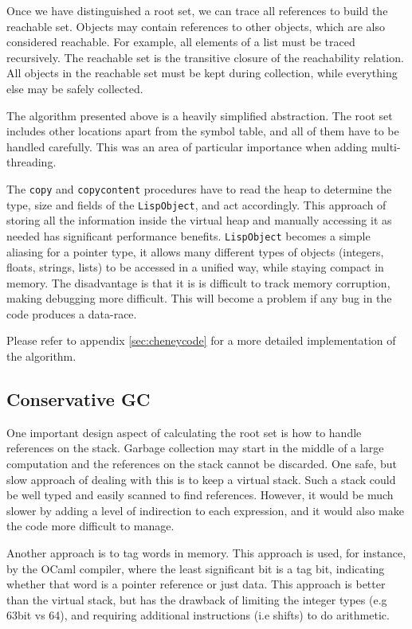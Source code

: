 Once we have distinguished a root set, we can trace all references to build the reachable set. Objects may contain references
to other objects, which are also considered reachable. For example, all elements of a list must be traced recursively.
The reachable set is the transitive closure of the reachability relation. All objects in the reachable set must be kept
during collection, while everything else may be safely collected.

The algorithm presented above is a heavily simplified abstraction. The root set includes other
locations apart from the symbol table, and all of them have to be handled carefully. This was an area
of particular importance when adding multi-threading.

The \texttt{copy} and \texttt{copycontent} procedures have to read the heap to determine the type, size and fields of
the \texttt{LispObject}, and act accordingly. This approach of storing all the information inside the virtual heap
and manually accessing it as needed has significant performance benefits. \texttt{LispObject} becomes a simple aliasing
for a pointer type, it allows many different types of objects (integers, floats, strings, lists) to be accessed
in a unified way, while staying compact in memory. The disadvantage is that it is is difficult to track memory
corruption, making debugging more difficult. This will become a problem if any bug in the code produces a data-race.

Please refer to appendix \ref{sec:cheneycode} for a more detailed implementation of the algorithm.

\subsection{Conservative GC}
One important design aspect of calculating the root set is how to handle references on the stack. Garbage collection
may start in the middle of a large computation and the references on the stack cannot be discarded. One safe, but slow
approach of dealing with this is to keep a virtual stack. Such a stack could be well typed and easily scanned to find
references. However, it would be much slower by adding a level of indirection to each expression, and it would also make
the code more difficult to manage.

Another approach is to tag words in memory. This approach is used, for instance, by the OCaml compiler, where the least
significant bit is a tag bit, indicating whether that word is a pointer reference or just data. This approach is better
than the virtual stack, but has the drawback of limiting the integer types (e.g 63bit vs 64), and requiring additional
instructions (i.e shifts) to do arithmetic.

